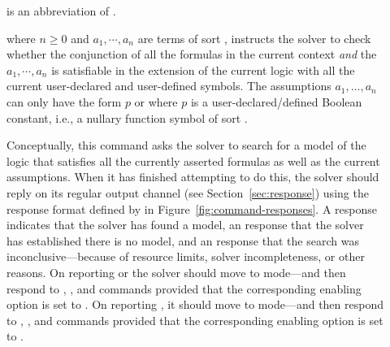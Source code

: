 \begin{description}

%
\item[] is an abbreviation of .
\smallskip

%
\item[] where $n \geq 0$
and $a_1, \cdots, a_n$ are terms of sort ,
%
instructs the solver to check whether the conjunction of all the formulas 
in the current context \emph{and} the  $a_1, \cdots, a_n$
is satisfiable in the extension of the current logic with all the current 
user-declared and user-defined symbols.
The assumptions $a_1, \ldots, a_n$ can only have the form $p$ or  
where $p$ is a user-declared/defined Boolean constant, i.e., 
a nullary function symbol of sort .

Conceptually, this command asks the solver to search for a model of the logic 
that satisfies all the currently asserted formulas as well as 
the current assumptions.
When it has finished attempting to do this, the solver should reply 
on its regular output channel (see Section~\ref{sec:response}) using 
the response format defined by  
in Figure~\ref{fig:command-responses}.
A  response indicates that the solver has found a model,
an  response that the solver has established there is no model, and 
an  response that the search was inconclusive---because of 
resource limits, solver incompleteness, or other reasons.
%
On reporting  or  the solver should move 
to  mode---and then respond to , , and
 commands provided that the corresponding enabling option is set 
to .
On reporting , it should move to  mode---and then respond
to , , and 
 commands
provided that the corresponding enabling option is set to .


\end{description}
